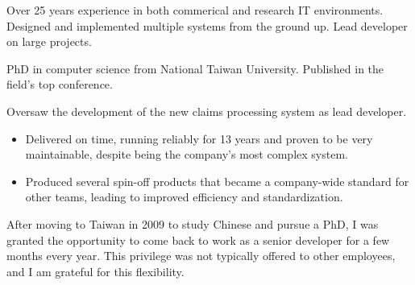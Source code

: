 \documentclass[10pt,a4paper]{../altacv}
\begin{document}

\begin{fullwidth}
\makecvheader

Over 25 years experience in both commerical and research IT environments. Designed and implemented multiple systems from the ground up. Lead developer on large projects.

PhD in computer science from National Taiwan University. Published in the field’s top conference. 

\end{fullwidth}

\small



Oversaw the development of the new claims processing system as lead developer.

\medskip

\begin{itemize}
	\item\small{Delivered on time, running reliably for 13 years and proven to be very maintainable, despite being the company's most complex system.}
	\item\small{Produced several spin-off products that became a company-wide standard for other teams, leading to improved efficiency and standardization.}
\end{itemize}

\medskip

After moving to Taiwan in 2009 to study Chinese and pursue a PhD, I was granted the opportunity to come back to work as a senior developer for a few months every year. This privilege was not typically offered to other employees, and I am grateful for this flexibility.
\end{document}
